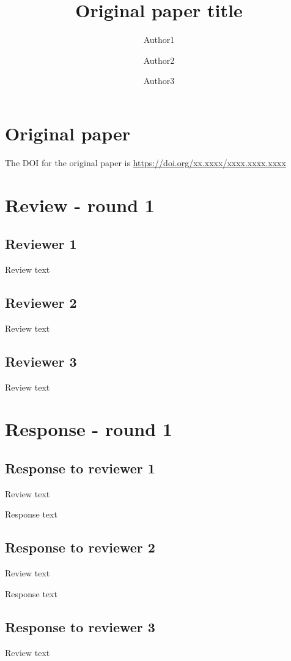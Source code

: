 \documentclass[
  manuscript=editorial,
  layout=publish,
  year=20xx,
  volume=x,
]{extra/review}
\title{
Original paper title
}
\author{Author1}
\author{Author2}
\author{Author3}
\begin{document}
\section{Original paper}


The DOI for the original paper is \url{https://doi.org/xx.xxxx/xxxx.xxxx.xxxx}


\section{Review - round 1}

\subsection{Reviewer 1}
Review text

\subsection{Reviewer 2}
Review text

\subsection{Reviewer 3}
Review text

\section{Response - round 1}

\subsection{Response to reviewer 1}
Review text

\begin{response}
Response text
\end{response}

\subsection{Response to reviewer 2}
Review text

\begin{response}
Response text
\end{response}


\subsection{Response to reviewer 3}
Review text
\end{document}
